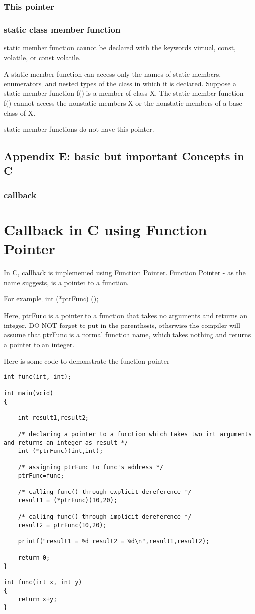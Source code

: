 \documentclass{book}
\begin{document}
\subsection{This pointer}

\subsection{static class member function}
static member function cannot be declared with the keywords virtual, const, volatile, or const volatile.

A static member function can access only the names of static members, enumerators, and nested types of the class in which it is declared. 
Suppose a static member function f() is a member of class X. 
The static member function f() cannot access the nonstatic members X or the nonstatic members of a base class of X.

static member functions do not have this pointer.
\section{Appendix E: basic but important Concepts in C }
\subsection{callback}
\chapter{Callback in C using Function Pointer}

In C, callback is implemented using Function Pointer. Function Pointer - as the name suggests, is a pointer to a function.

For example, int (*ptrFunc) ();

Here, ptrFunc is a pointer to a function that takes no arguments and returns an integer. 
DO NOT forget to put in the parenthesis, otherwise the compiler will assume that ptrFunc is a normal function name, which takes nothing and returns a pointer to an integer.

Here is some code to demonstrate the function pointer.
\begin{lstlisting}
int func(int, int);

int main(void)
{

    int result1,result2;

    /* declaring a pointer to a function which takes two int arguments and returns an integer as result */
    int (*ptrFunc)(int,int);

    /* assigning ptrFunc to func's address */                        
    ptrFunc=func;

    /* calling func() through explicit dereference */
    result1 = (*ptrFunc)(10,20);

    /* calling func() through implicit dereference */            
    result2 = ptrFunc(10,20);                  

    printf("result1 = %d result2 = %d\n",result1,result2);

    return 0;
}

int func(int x, int y)
{
    return x+y;
}
\end{lstlisting}
\end{document}
